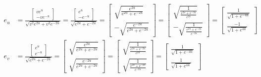 \documentclass[a4paper, 11pt]{article}
\begin{document}
\begin{enumerate}[label=(\alph*)]
        \begin{align*}
          e_u & = \frac{
          \begin{bmatrix}
            ve^u \\
            -ve^{-u}
          \end{bmatrix}
          }{
          \sqrt{v^2e^{2u} + v^2e^{-2u}}
          }
          = \frac{
            \begin{bmatrix}
              e^u \\
              -e^{-u}
            \end{bmatrix}}{
            \sqrt{e^{2u} + e^{-2u}}
          }
          = \begin{bmatrix}
              \sqrt{\frac{e^{2u}}{e^{2u} + e^{-2u}}} \\
              -\sqrt{\frac{e^{-2u}}{e^{2u} + e^{-2u}}}
            \end{bmatrix}
          = \begin{bmatrix}
              \sqrt{\frac{1}{\frac{e^{2u} + e^{-2u}}{e^{2u}}}} \\
              -\sqrt{\frac{1}{\frac{e^{2u} + e^{-2u}}{e^{-2u}}}}
            \end{bmatrix}
          = \begin{bmatrix}
              \frac{1}{\sqrt{1 + e^{-4u}}} \\
              \frac{-1}{\sqrt{1 + e^{4u}}}
            \end{bmatrix} \\
          e_v & = \frac{
          \begin{bmatrix}
            e^u \\
            e^{-u}
          \end{bmatrix}}{
          \sqrt{e^{2u}+e^{-2u}}
          }
          = \begin{bmatrix}
              \sqrt{\frac{e^{2u}}{e^{2u} + e^{-2u}}} \\
              \sqrt{\frac{e^{-2u}}{e^{2u} + e^{-2u}}}
            \end{bmatrix}
          = \begin{bmatrix}
              \sqrt{\frac{1}{\frac{e^{2u} + e^{-2u}}{e^{2u}}}} \\
              \sqrt{\frac{1}{\frac{e^{2u} + e^{-2u}}{e^{-2u}}}}
            \end{bmatrix}
          = \begin{bmatrix}
              \frac{1}{\sqrt{1 + e^{-4u}}} \\
              \frac{1}{\sqrt{1 + e^{4u}}}

\end{bmatrix}
\end{align*}
\end{enumerate}
\end{document}
